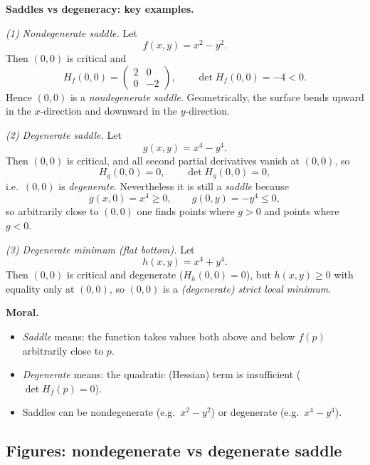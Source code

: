 \documentclass[12pt,a4paper]{article}
\theoremstyle{plain}
\theoremstyle{definition}      %
\begin{document}
	\bigskip
	\noindent\textbf{Saddles vs degeneracy: key examples.}
	
	\medskip
	\noindent\emph{(1) Nondegenerate saddle.}
	Let
	\[
	f(x,y)=x^2-y^2.
	\]
	Then $(0,0)$ is critical and
	\[
	H_f(0,0)=
	\begin{pmatrix}
		2 & 0\\
		0 & -2
	\end{pmatrix},
	\qquad
	\det H_f(0,0)=-4<0.
	\]
	Hence $(0,0)$ is a \emph{nondegenerate saddle}. Geometrically, the surface bends upward in the $x$-direction and downward in the $y$-direction.
	
	\medskip
	\noindent\emph{(2) Degenerate saddle.}
	Let
	\[
	g(x,y)=x^4-y^4.
	\]
	Then $(0,0)$ is critical, and all second partial derivatives vanish at $(0,0)$, so
	\[
	H_g(0,0)=0,
	\qquad
	\det H_g(0,0)=0,
	\]
	i.e.\ $(0,0)$ is \emph{degenerate}. Nevertheless it is still a \emph{saddle} because
	\[
	g(x,0)=x^4\ge 0,
	\qquad
	g(0,y)=-y^4\le 0,
	\]
	so arbitrarily close to $(0,0)$ one finds points where $g>0$ and points where $g<0$.
	
	\medskip
	\noindent\emph{(3) Degenerate minimum (flat bottom).}
	Let
	\[
	h(x,y)=x^4+y^4.
	\]
	Then $(0,0)$ is critical and degenerate ($H_h(0,0)=0$), but $h(x,y)\ge 0$ with equality only at $(0,0)$, so $(0,0)$ is a \emph{(degenerate) strict local minimum}.
	
	\medskip
	\noindent\textbf{Moral.}
	\begin{itemize}
		\item \emph{Saddle} means: the function takes values both above and below $f(p)$ arbitrarily close to $p$.
		\item \emph{Degenerate} means: the quadratic (Hessian) term is insufficient ($\det H_f(p)=0$).
		\item Saddles can be nondegenerate (e.g.\ $x^2-y^2$) or degenerate (e.g.\ $x^4-y^4$).
	\end{itemize}
	
	
	\subsection*{Figures: nondegenerate vs degenerate saddle}
	
\end{document}
